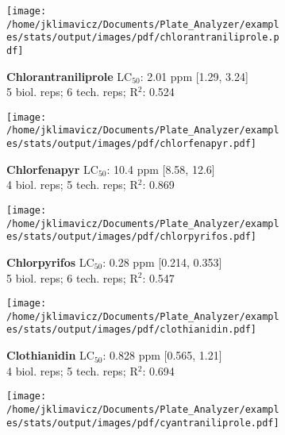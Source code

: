 \documentclass{article}
\begin{document}
\begin{figure}[thp!]
   \begin{subfigure}{0.500\textwidth}
      \centering
      \texttt{[image: /home/jklimavicz/Documents/Plate\_Analyzer/examples/stats/output/images/pdf/chlorantraniliprole.pdf]}
      \vspace{-0.05cm}
      \caption*{\textbf{Chlorantraniliprole} LC$_{50}$: 2.01 ppm [1.29, 3.24] \\ 
5 biol. reps; 6 tech. reps; R$^2$: 0.524}
      \vspace{0.1cm}
   \end{subfigure}%
   \begin{subfigure}{0.500\textwidth}
      \centering
      \texttt{[image: /home/jklimavicz/Documents/Plate\_Analyzer/examples/stats/output/images/pdf/chlorfenapyr.pdf]}
      \vspace{-0.05cm}
      \caption*{\textbf{Chlorfenapyr} LC$_{50}$: 10.4 ppm [8.58, 12.6] \\ 
4 biol. reps; 5 tech. reps; R$^2$: 0.869}
      \vspace{0.1cm}
   \end{subfigure}%
\vspace{-0.1cm}
   \begin{subfigure}{0.500\textwidth}
      \centering
      \texttt{[image: /home/jklimavicz/Documents/Plate\_Analyzer/examples/stats/output/images/pdf/chlorpyrifos.pdf]}
      \vspace{-0.05cm}
      \caption*{\textbf{Chlorpyrifos} LC$_{50}$: 0.28 ppm [0.214, 0.353] \\ 
5 biol. reps; 6 tech. reps; R$^2$: 0.547}
      \vspace{0.1cm}
   \end{subfigure}%
   \begin{subfigure}{0.500\textwidth}
      \centering
      \texttt{[image: /home/jklimavicz/Documents/Plate\_Analyzer/examples/stats/output/images/pdf/clothianidin.pdf]}
      \vspace{-0.05cm}
      \caption*{\textbf{Clothianidin} LC$_{50}$: 0.828 ppm [0.565, 1.21] \\ 
4 biol. reps; 5 tech. reps; R$^2$: 0.694}
      \vspace{0.1cm}
   \end{subfigure}%
\vspace{-0.1cm}
   \begin{subfigure}{0.500\textwidth}
      \centering
      \texttt{[image: /home/jklimavicz/Documents/Plate\_Analyzer/examples/stats/output/images/pdf/cyantraniliprole.pdf]}

\end{subfigure}
\end{figure}
\end{document}
